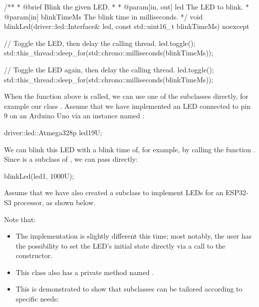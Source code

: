 \begin{cppcode}
/**
 * @brief Blink the given LED.
 *
 * @param[in, out] led The LED to blink.
 * @param[in] blinkTimeMs The blink time in milliseconds.
 */
void blinkLed(driver::led::Interface& led, const std::uint16_t blinkTimeMs) noexcept
{
    // Toggle the LED, then delay the calling thread.
    led.toggle();
    std::this_thread::sleep_for(std::chrono::milliseconds(blinkTimeMs));

    // Toggle the LED again, then delay the calling thread.
    led.toggle();
    std::this_thread::sleep_for(std::chrono::milliseconds(blinkTimeMs));
}
\end{cppcode}

\noindent When the function above is called, we can use one of the subclasses directly, for example
our class . Assume that we have implemented an LED connected to pin 9
on an Arduino Uno via an instance named :

\begin{cppcode}
driver::led::Atmega328p led1{9U};
\end{cppcode}

\noindent We can blink this LED with a blink time of, for example,  by calling the
function . Since  is a subclass of
, we can pass  directly:

\begin{cppcode}
blinkLed(led1, 1000U);
\end{cppcode}

\noindent Assume that we have also created a subclass  to implement LEDs
for an ESP32-S3 processor, as shown below.

Note that:
\begin{itemize}
  \item The implementation is slightly different this time; most notably, the user has the
    possibility to set the LED's initial state directly via a call to the constructor.
  \item This class also has a private method named .
  \item This is demonstrated to show that subclasses can be tailored according to specific needs:
\end{itemize}

